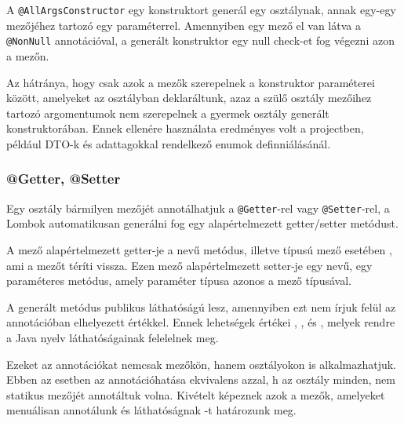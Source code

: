 A \lstinline|@AllArgsConstructor| egy konstruktort generál egy osztálynak, annak egy-egy mezőjéhez tartozó egy paraméterrel. Amennyiben egy mező el van látva a \lstinline|@NonNull| annotációval, a generált konstruktor egy null check-et fog végezni azon a mezőn.


Az  hátránya, hogy csak azok a mezők szerepelnek a konstruktor paraméterei között, amelyeket az osztályban deklaráltunk, azaz a szülő osztály mezőihez tartozó argomentumok nem szerepelnek a gyermek osztály generált konstruktorában. Ennek ellenére használata eredményes volt a projectben, például DTO-k és adattagokkal rendelkező enumok definniálásánál.


\subsubsection{@Getter, @Setter}

Egy osztály bármilyen mezőjét annotálhatjuk a  \lstinline|@Getter|-rel vagy \lstinline|@Setter|-rel, a Lombok automatikusan generálni fog egy alapértelmezett getter/setter metódust. \par

A  mező alapértelmezett getter-je a  nevű metódus, illetve  típusú mező esetében , ami a  mezőt téríti vissza. Ezen mező alapértelmezett setter-je egy  nevű, egy paraméteres metódus, amely paraméter típusa azonos a mező típusával. \par

A generált metódus publikus láthatóságú lesz, amennyiben ezt nem írjuk felül az annotációban elhelyezett  értékkel. Ennek lehetségek értékei , ,  és , melyek rendre a Java nyelv láthatóságainak felelelnek meg. \par

Ezeket az annotációkat nemcsak mezőkön, hanem osztályokon is alkalmazhatjuk. Ebben az esetben az annotációhatása ekvivalens azzal, h az osztály minden, nem statikus mezőjét annotáltuk volna. Kivételt képeznek azok a mezők, amelyeket menuálisan annotálunk és láthatóságnak -t határozunk meg. \par


